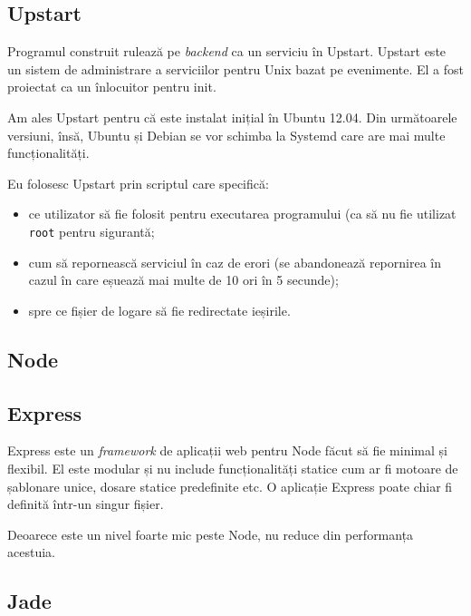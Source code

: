 \documentclass[a4wide,12pt]{report}
\newcommand{\eng}[1]{\emph{#1}} %
\newcommand{\cod}[1]{\texttt{#1}}
\begin{document}
\subsection{Upstart}

Programul construit rulează pe \eng{backend} ca un serviciu în Upstart. Upstart
este un sistem de administrare a serviciilor pentru Unix bazat pe evenimente. El
a fost proiectat ca un înlocuitor pentru init.

Am ales Upstart pentru că este instalat inițial în Ubuntu 12.04. Din următoarele
versiuni, însă, Ubuntu și Debian se vor schimba la Systemd care are mai multe
funcționalități.

Eu folosesc Upstart prin scriptul care specifică:

\begin{itemize}

\item ce utilizator să fie folosit pentru executarea programului (ca să nu fie
utilizat \cod{root} pentru sigurantă;

\item cum să repornească serviciul în caz de erori (se abandonează repornirea în
cazul în care eșuează mai multe de 10 ori în 5 secunde);

\item spre ce fișier de logare să fie redirectate ieșirile.

\end{itemize}

\subsection{Node}

\subsection{Express}

Express este un \eng{framework} de aplicații web pentru Node făcut să fie
minimal și flexibil. El este modular și nu include funcționalități statice cum
ar fi motoare de șablonare unice, dosare statice predefinite etc. O aplicație
Express poate chiar fi definită într-un singur fișier.

Deoarece este un nivel foarte mic peste Node, nu reduce din performanța
acestuia.

\subsection{Jade}
\end{document}
